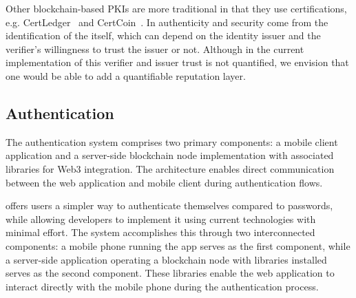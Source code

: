 Other blockchain-based PKIs are more traditional in that they use certifications, e.g. CertLedger~\cite{kubilay_certledger:_2019}  and CertCoin~\cite{fromknecht_decentralized_2014}. In \deeid authenticity and security come from the identification of the \deeid itself, which can depend on the identity issuer and the verifier's willingness to trust the issuer or not. Although in the current implementation of \deeid this verifier and issuer trust is not quantified, we envision that one would be able to add a quantifiable reputation layer.

\subsection{Authentication}
The \deeid authentication system comprises two primary components: a mobile client application and a server-side blockchain node implementation with associated libraries for Web3 integration. The architecture enables direct communication between the web application and mobile client during authentication flows.



\deeid offers users a simpler way to authenticate themselves compared to passwords, while allowing developers to implement it using current technologies with minimal effort. The system accomplishes this through two interconnected components: a mobile phone running the \deeid app serves as the first component, while a server-side application operating a blockchain node with \deeid libraries installed serves as the second component. These libraries enable the web application to interact directly with the mobile phone during the authentication process.

